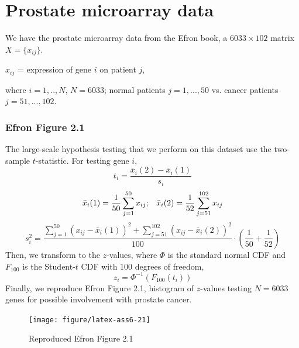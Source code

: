 \documentclass{article}\usepackage{graphicx, color}
\newenvironment{knitrout}{}{} %
\begin{document}
\newpage
\section*{Prostate microarray data}
\hspace{12 pt} We have the prostate microarray data from the Efron
book, a $6033 \times 102$ matrix $X=\{x_{ij}\}$.
\begin{center}
$x_{ij}$ = expression of gene $i$ on patient $j$, 
\end{center}
where $i=1,..,N$, $N=6033$; normal patients $j=1,...,50$ vs. cancer
patients $j=51,...,102$.




\subsubsection*{Efron Figure 2.1}
\hspace{12 pt} The large-scale hypothesis testing that we perform on
this dataset use the two-sample $t$-statistic. \newline
For testing gene $i$,
\begin{displaymath}
t_i = \frac{\bar{x}_i(2) - \bar{x}_i(1)}{s_i}
\end{displaymath}
\begin{displaymath}
\bar{x}_i(1) = \frac{1}{50} \sum_{j=1}^{50} x_{ij} ; \hspace{8 pt}
\bar{x}_i(2) = \frac{1}{52} \sum_{j=51}^{102} x_{ij}
\end{displaymath}
\begin{displaymath}
s_i^2 = \frac{\sum_{j=1}^{50} (x_{ij} - \bar{x}_i(1))^2 +
  \sum_{j=51}^{102} (x_{ij} - \bar{x}_i(2))^2 }{100} \cdot (\frac{1}{50} + \frac{1}{52}) 
\end{displaymath}
Then, we transform to the $z$-values, 
where $\Phi$ is the standard normal CDF and $F_{100}$ is the Student-$t$ CDF
with 100 degrees of freedom,
\begin{displaymath}
z_i = \Phi^{-1}(F_{100}(t_i))
\end{displaymath}
Finally, we reproduce Efron
Figure 2.1, histogram of $z$-values testing $N=6033$ genes
for possible involvement with prostate cancer.

\begin{knitrout}
\color{fgcolor}\begin{figure}[]


{\centering \texttt{[image: figure/latex-ass6-21]} 

}

\caption[Reproduced Efron Figure 2]{Reproduced Efron Figure 2.1\label{fig:ass6-21}}
\end{figure}


\end{knitrout}
\end{document}
